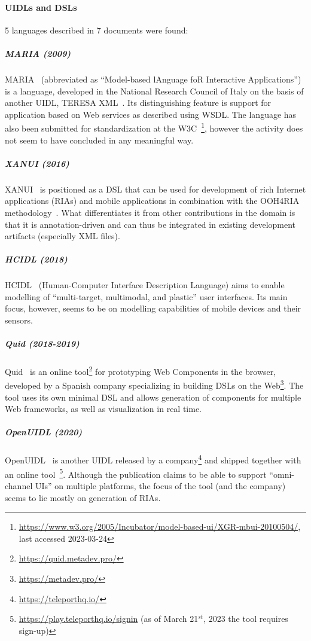 \paragraph{UIDLs and DSLs}
5 languages described in 7 documents were found:

\subparagraph{MARIA (2009)}
MARIA~\cite{Paterno2009, MariaPDF} (abbreviated as \enquote{Model-based lAnguage foR Interactive Applications}) is a language, developed in the National Research Council of Italy on the basis of another UIDL, TERESA XML~\cite{mori2004}.
Its distinguishing feature is support for application based on Web services as described using WSDL\@.
The language has also been submitted for standardization at the W3C~\footnote{\url{https://www.w3.org/2005/Incubator/model-based-ui/XGR-mbui-20100504/}, last accessed 2023-03-24}, however the activity does not seem to have concluded in any meaningful way.

\subparagraph{XANUI  (2016)}
XANUI~\cite{hermida2016xanui} is positioned as a DSL that can be used for development of rich Internet applications (RIAs) and mobile applications in combination with the OOH4RIA methodology~\cite{Meli2008}.
What differentiates it from other contributions in the domain is that it is annotation-driven and can thus be integrated in existing development artifacts (especially XML files).

\subparagraph{HCIDL (2018)}
HCIDL~\cite{Gaouar2018} (Human-Computer Interface Description Language) aims to enable modelling of \enquote{multi-target, multimodal, and plastic} user interfaces.
Its main focus, however, seems to be on modelling capabilities of mobile devices and their sensors.

\subparagraph{Quid (2018-2019)}
Quid~\cite{molina2018quid, Molina2019} is an online tool\footnote{\url{https://quid.metadev.pro/}} for prototyping Web Components in the browser, developed by a Spanish company specializing in building DSLs on the Web\footnote{\url{https://metadev.pro/}}.
The tool uses its own minimal DSL and allows generation of components for multiple Web frameworks, as well as visualization in real time.

\subparagraph{OpenUIDL (2020)}
OpenUIDL~\cite{Moldovan2020} is another UIDL released by a company\footnote{\url{https://teleporthq.io/}} and shipped together with an online tool~\footnote{\url{https://play.teleporthq.io/signin} (as of March 21$^{st}$, 2023 the tool requires sign-up)}.
Although the publication claims to be able to support \enquote{omni-channel UIs} on multiple platforms, the focus of the tool (and the company) seems to lie mostly on generation of RIAs.


